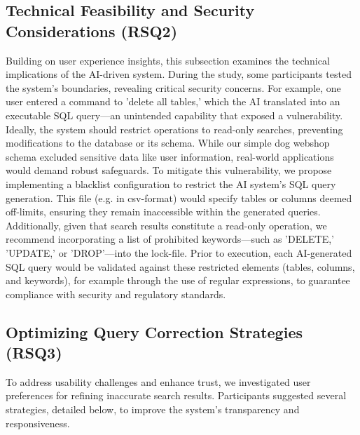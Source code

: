 \documentclass[../../submission.tex]{subfiles}
\begin{document}
\subsection{Technical Feasibility and Security Considerations (RSQ2)}
Building on user experience insights, this subsection examines the technical implications 
of the AI-driven system. During the study, some participants tested the system’s boundaries, 
revealing critical security concerns. For example, one user entered a command to 'delete 
all tables,' which the AI translated into an executable SQL query—an unintended capability 
that exposed a vulnerability. Ideally, the system should restrict operations to read-only 
searches, preventing modifications to the database or its schema. While our simple dog 
webshop schema excluded sensitive data like user information, real-world applications 
would demand robust safeguards. To mitigate this vulnerability, we propose implementing a blacklist configuration to 
restrict the AI system's SQL query generation. This file (e.g. in csv-format) would specify tables or 
columns deemed off-limits, ensuring they remain inaccessible within the generated 
queries. Additionally, given that search results constitute a read-only operation, we 
recommend incorporating a list of prohibited keywords—such as 'DELETE,' 'UPDATE,' or 'DROP'—into the lock-file. 
Prior to execution, each AI-generated SQL query would be validated against these restricted elements 
(tables, columns, and keywords), for example through the use of regular expressions, 
to guarantee compliance with security and regulatory standards.

\subsection{Optimizing Query Correction Strategies (RSQ3)}
To address usability challenges and enhance trust, we investigated user preferences 
for refining inaccurate search results. Participants suggested several strategies, 
detailed below, to improve the system’s transparency and responsiveness.
\end{document}

